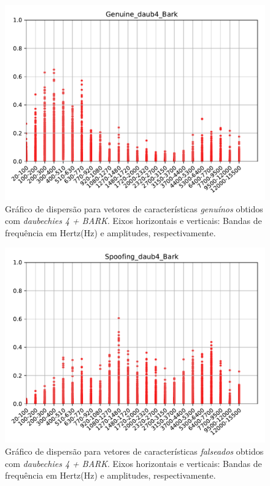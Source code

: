 		\begin{figure}[H]
			\centering
			\includegraphics[scale=.8]{images/results/barkVersusMel/Genuine_daub4_Bark.pdf}
			\caption{Gráfico de dispersão para vetores de características \textit{genuínos} obtidos com \textit{daubechies 4 + BARK}.  Eixos horizontais e verticais: Bandas de frequência em Hertz(Hz) e amplitudes, respectivamente.}
			\label{fig:livedaub4bark}
		\end{figure}
		\begin{figure}[H]
			\centering
			\includegraphics[scale=.8]{images/results/barkVersusMel/Spoofing_daub4_Bark.pdf}
			\caption{Gráfico de dispersão para vetores de características \textit{falseados} obtidos com \textit{daubechies 4 + BARK}.  Eixos horizontais e verticais: Bandas de frequência em Hertz(Hz) e amplitudes, respectivamente.}
			\label{fig:spoofingdaub4bark}
		\end{figure}
